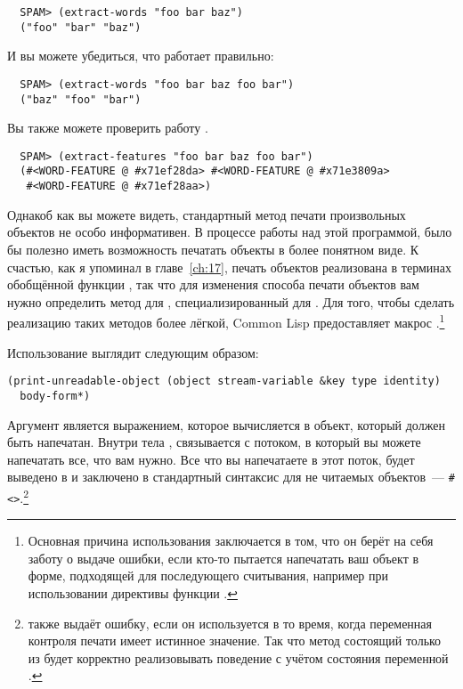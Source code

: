 \begin{verbatim}
  SPAM> (extract-words "foo bar baz")
  ("foo" "bar" "baz")
\end{verbatim}

И вы можете убедиться, что  работает правильно:

\begin{verbatim}
  SPAM> (extract-words "foo bar baz foo bar")
  ("baz" "foo" "bar")
\end{verbatim}

Вы также можете проверить работу .

\begin{verbatim}
  SPAM> (extract-features "foo bar baz foo bar")
  (#<WORD-FEATURE @ #x71ef28da> #<WORD-FEATURE @ #x71e3809a>
   #<WORD-FEATURE @ #x71ef28aa>)
\end{verbatim}

Однакоб как вы можете видеть, стандартный метод печати произвольных объектов не особо
информативен.  В процессе работы над этой программой, было бы полезно иметь возможность
печатать объекты  в более понятном виде.  К счастью, как я упоминал в
главе~\ref{ch:17}, печать объектов реализована в терминах обобщённой функции
, так что для изменения способа печати объектов  вам
нужно определить метод для , специализированный для
.  Для того, чтобы сделать реализацию таких методов более лёгкой,
Common Lisp предоставляет макрос .\footnote{Основная причина
  использования  заключается в том, что он берёт на себя
  заботу о выдаче ошибки, если кто-то пытается напечатать ваш объект в форме, подходящей
  для последующего считывания, например при использовании директивы  функции
  .}

Использование  выглядит следующим образом:

\begin{lstlisting}
(print-unreadable-object (object stream-variable &key type identity)
  body-form*)
\end{lstlisting}

Аргумент  является выражением, которое вычисляется в объект, который должен
быть напечатан.  Внутри тела , 
связывается с потоком, в который вы можете напечатать все, что вам нужно. Все что вы
напечатаете в этот поток, будет выведено в  и заключено в
стандартный синтаксис для не читаемых объектов~---
\lstinline!#<>!.\footnote{ также выдаёт ошибку, если он
  используется в то время, когда переменная контроля печати  имеет
  истинное значение.  Так что метод  состоящий только из
   будет корректно реализовывать поведение
   с учётом состояния переменной .}

